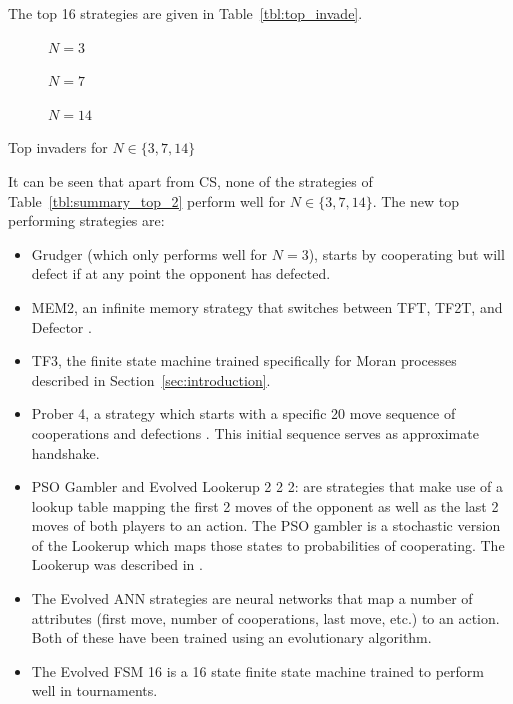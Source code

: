\documentclass[10pt,journal]{IEEEtran}
\begin{document}
The top 16 strategies are given in Table~\ref{tbl:top_invade}.

\begin{table}[!hbtp]
    \centering
    \scriptsize
    \begin{subfigure}[t]{\columnwidth}
        \centering
        
        \caption{\(N=3\)}
    \end{subfigure}%

    \begin{subfigure}[t]{\columnwidth}
        \centering
        
        \caption{\(N=7\)}
    \end{subfigure}

    \begin{subfigure}[t]{\columnwidth}
        \centering
        
        \caption{\(N=14\)}
    \end{subfigure}
    \caption{Top invaders for \(N\in\{3, 7, 14\}\)}
    \label{tbl:top_invade}
\end{table}

It can be seen that apart from CS, none of the strategies
of Table~\ref{tbl:summary_top_2} perform well for \(N\in\{3, 7, 14\}\). The new
top performing strategies are:

\begin{itemize}
    \item Grudger (which only performs well for \(N=3\)), starts by cooperating
        but will defect if at any point the opponent has defected.
    \item MEM2, an infinite memory strategy that switches between TFT, TF2T, and
        Defector \cite{Li2014}.
    \item TF3, the finite state machine trained specifically for Moran processes
        described in Section~\ref{sec:introduction}.
    \item Prober 4, a strategy which starts with a specific 20 move sequence of
        cooperations and defections \cite{Prison1998}. This initial sequence serves
        as approximate handshake.
    \item  PSO Gambler and Evolved Lookerup 2 2 2: are strategies that make use
        of a lookup table mapping the first 2 moves of the opponent as well as
        the last 2 moves of both players to an action. The PSO gambler is a
        stochastic version of the Lookerup which maps those states to probabilities of cooperating. The Lookerup was described in \cite{Knight2016}.
    \item The Evolved ANN strategies are neural networks that map a number of
	    attributes (first move, number of cooperations, last move, etc.) to
	    an action. Both of these have been trained using an evolutionary
	    algorithm.
    \item The Evolved FSM 16 is a 16 state finite state machine trained to
        perform well in tournaments.
\end{itemize}
\end{document}
